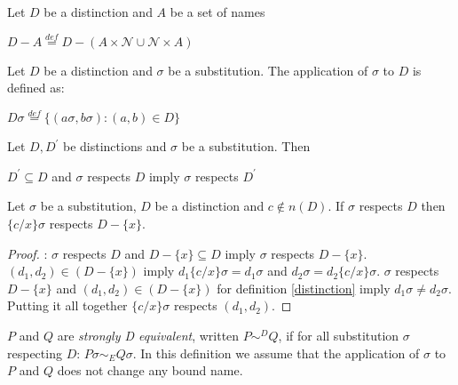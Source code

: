 \begin{definition}
  Let $D$ be a distinction and $A$ be a set of names
  \begin{center}
    $D-A \stackrel{def}{=} D - (A\times \mathcal{N} \cup \mathcal{N} \times A)$
  \end{center}
\end{definition}

\begin{definition}
  Let $D$ be a distinction and $\sigma$ be a substitution. The application of $\sigma$ to $D$ is defined as:
  \begin{center}
    $D\sigma \stackrel{def}{=} \{(a\sigma,b\sigma): (a,b)\in D\}$
  \end{center}
\end{definition}

\begin{proposition}
  Let $D,D^{'}$ be distinctions and $\sigma$ be a substitution. Then
  \begin{center}
    $D^{'}\subseteq D$ and $\sigma$ respects $D$ imply $\sigma$ respects $D^{'}$
  \end{center}
\end{proposition}


\begin{lemma}\label{distinctionSubstitution}
  Let $\sigma$ be a substitution, $D$ be a distinction and $c\notin n(D)$. If $\sigma$ respects $D$ then $\{c/x\}\sigma$ respects $D-\{x\}$.
  \begin{proof}:
    $\sigma$ respects $D$ and $D-\{x\}\subseteq D$ imply $\sigma$ respects $D-\{x\}$. $(d_{1},d_{2}) \in (D-\{x\})$ imply $d_{1} \{c/x\}\sigma = d_{1} \sigma$ and $d_{2} \sigma = d_{2} \{c/x\}\sigma$. $\sigma$ respects $D-\{x\}$ and $(d_{1},d_{2}) \in (D-\{x\})$ for definition \ref{distinction} imply $d_{1} \sigma \neq d_{2} \sigma$.  Putting it all together $\{c/x\}\sigma $ respects $(d_{1}, d_{2})$.
  \end{proof}
\end{lemma}


\begin{definition}\label{strongDequivalence}
  $P$ and $Q$ are \emph{strongly D equivalent}, written $P \sim^{D} Q$, if for all substitution $\sigma$ respecting $D$: $P\sigma \sim_{E} Q\sigma$. In this definition we assume that the application of $\sigma$ to $P$ and $Q$ does not change any bound name.
\end{definition}

